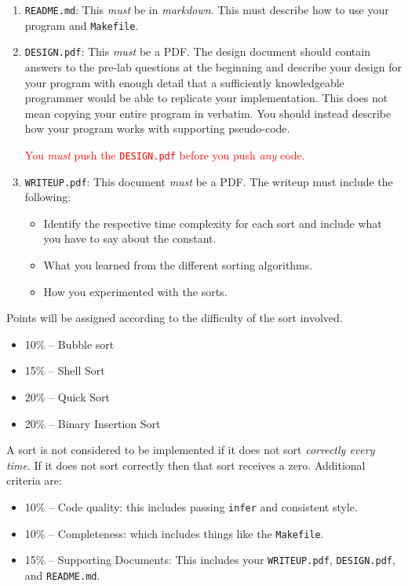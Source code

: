 \documentclass[11pt]{article}
\begin{document}
\begin{enumerate}
\begin{itemize}
  \end{itemize}

\item \texttt{README.md}: This \emph{must} be in \emph{markdown}.
This must describe how to use your program and \texttt{Makefile}.

\item \texttt{DESIGN.pdf}: This \emph{must} be a PDF. The design document
should contain answers to the pre-lab questions at the beginning and  describe
your design for your program with enough detail that a sufficiently knowledgeable
programmer would be able to replicate your implementation. This does not mean
copying your entire program in verbatim. You should instead describe how your
program works with supporting pseudo-code.

\textcolor{red}{You \emph{must} push the \texttt{DESIGN.pdf} before you push
\emph{any} code.}

\item \texttt{WRITEUP.pdf}: This document \emph{must} be a PDF. The writeup must
    include the following:
\begin{itemize}
  \item Identify the respective time complexity for each sort and include what
      you have to say about the constant.
  \item What you learned from the different sorting algorithms.
  \item How you experimented with the sorts.

\end{itemize}
\end{enumerate}

\noindent Points will be assigned according to the difficulty of the sort
involved.
\begin{itemize}
    \item 10\% -- Bubble sort
    \item 15\% -- Shell Sort
    \item 20\% -- Quick Sort
    \item 20\% -- Binary Insertion Sort
\end{itemize}

A sort is not considered to be implemented if it does not sort \emph{correctly
every time}. If it does not sort correctly then that sort receives a zero.
Additional criteria are:
\begin{itemize}
    \item 10\% -- Code quality: this includes passing \texttt{infer} and
        consistent style.
    \item 10\% -- Completeness: which includes things like the
        \texttt{Makefile}.
    \item 15\% -- Supporting Documents: This includes your \texttt{WRITEUP.pdf},
        \texttt{DESIGN.pdf}, and \texttt{README.md}.
\end{itemize}
\end{document}
